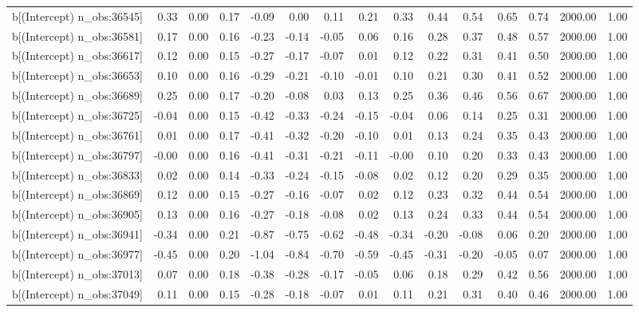 \begin{table}[ht]
\begin{tabular}{rrrrrrrrrrrrrrr}
  b[(Intercept) n\_obs:36545] & 0.33 & 0.00 & 0.17 & -0.09 & 0.00 & 0.11 & 0.21 & 0.33 & 0.44 & 0.54 & 0.65 & 0.74 & 2000.00 & 1.00 \\ 
  b[(Intercept) n\_obs:36581] & 0.17 & 0.00 & 0.16 & -0.23 & -0.14 & -0.05 & 0.06 & 0.16 & 0.28 & 0.37 & 0.48 & 0.57 & 2000.00 & 1.00 \\ 
  b[(Intercept) n\_obs:36617] & 0.12 & 0.00 & 0.15 & -0.27 & -0.17 & -0.07 & 0.01 & 0.12 & 0.22 & 0.31 & 0.41 & 0.50 & 2000.00 & 1.00 \\ 
  b[(Intercept) n\_obs:36653] & 0.10 & 0.00 & 0.16 & -0.29 & -0.21 & -0.10 & -0.01 & 0.10 & 0.21 & 0.30 & 0.41 & 0.52 & 2000.00 & 1.00 \\ 
  b[(Intercept) n\_obs:36689] & 0.25 & 0.00 & 0.17 & -0.20 & -0.08 & 0.03 & 0.13 & 0.25 & 0.36 & 0.46 & 0.56 & 0.67 & 2000.00 & 1.00 \\ 
  b[(Intercept) n\_obs:36725] & -0.04 & 0.00 & 0.15 & -0.42 & -0.33 & -0.24 & -0.15 & -0.04 & 0.06 & 0.14 & 0.25 & 0.31 & 2000.00 & 1.00 \\ 
  b[(Intercept) n\_obs:36761] & 0.01 & 0.00 & 0.17 & -0.41 & -0.32 & -0.20 & -0.10 & 0.01 & 0.13 & 0.24 & 0.35 & 0.43 & 2000.00 & 1.00 \\ 
  b[(Intercept) n\_obs:36797] & -0.00 & 0.00 & 0.16 & -0.41 & -0.31 & -0.21 & -0.11 & -0.00 & 0.10 & 0.20 & 0.33 & 0.43 & 2000.00 & 1.00 \\ 
  b[(Intercept) n\_obs:36833] & 0.02 & 0.00 & 0.14 & -0.33 & -0.24 & -0.15 & -0.08 & 0.02 & 0.12 & 0.20 & 0.29 & 0.35 & 2000.00 & 1.00 \\ 
  b[(Intercept) n\_obs:36869] & 0.12 & 0.00 & 0.15 & -0.27 & -0.16 & -0.07 & 0.02 & 0.12 & 0.23 & 0.32 & 0.44 & 0.54 & 2000.00 & 1.00 \\ 
  b[(Intercept) n\_obs:36905] & 0.13 & 0.00 & 0.16 & -0.27 & -0.18 & -0.08 & 0.02 & 0.13 & 0.24 & 0.33 & 0.44 & 0.54 & 2000.00 & 1.00 \\ 
  b[(Intercept) n\_obs:36941] & -0.34 & 0.00 & 0.21 & -0.87 & -0.75 & -0.62 & -0.48 & -0.34 & -0.20 & -0.08 & 0.06 & 0.20 & 2000.00 & 1.00 \\ 
  b[(Intercept) n\_obs:36977] & -0.45 & 0.00 & 0.20 & -1.04 & -0.84 & -0.70 & -0.59 & -0.45 & -0.31 & -0.20 & -0.05 & 0.07 & 2000.00 & 1.00 \\ 
  b[(Intercept) n\_obs:37013] & 0.07 & 0.00 & 0.18 & -0.38 & -0.28 & -0.17 & -0.05 & 0.06 & 0.18 & 0.29 & 0.42 & 0.56 & 2000.00 & 1.00 \\ 
  b[(Intercept) n\_obs:37049] & 0.11 & 0.00 & 0.15 & -0.28 & -0.18 & -0.07 & 0.01 & 0.11 & 0.21 & 0.31 & 0.40 & 0.46 & 2000.00 & 1.00 \\ 

\end{tabular}
\end{table}
